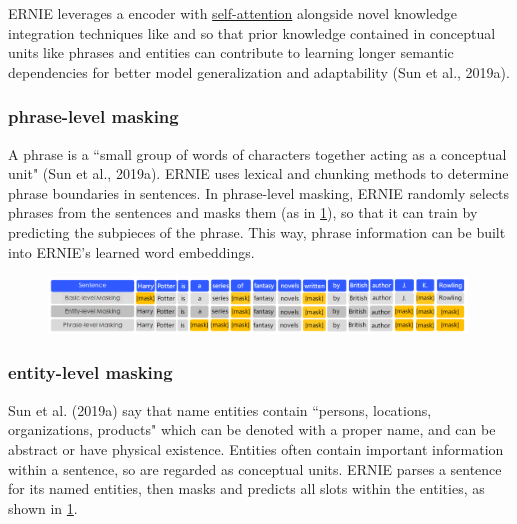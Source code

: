 ERNIE leverages a  encoder with \hyperref[sec:SelfAttention]{self-attention} alongside novel knowledge integration techniques like  and  so that prior knowledge contained in conceptual units like phrases and entities can contribute to learning longer semantic dependencies for better model generalization and adaptability (Sun et al., 2019a). 


\subsubsection{phrase-level masking}\label{sec:phrasemasking}

A phrase is a ``small group of words of characters together acting as a conceptual unit" (Sun et al., 2019a). ERNIE uses lexical and chunking methods to determine phrase boundaries in sentences. In phrase-level masking, ERNIE randomly selects phrases from the sentences and masks them (as in \cref{fig:ernie_maskingTypes}), so that it can train by predicting the subpieces of the phrase. This way, phrase information can be built into ERNIE's learned word embeddings. 



\begin{figure}[h]
\vspace{-5pt}
\centering
\includegraphics[width=0.99\textwidth]{imgs/ernie_maskingtypes.png}
\vspace{-5pt}
\vspace{-5pt}
\label{fig:ernie_maskingTypes}
\end{figure}


\subsubsection{entity-level masking}\label{sec:entitymasking}

Sun et al. (2019a) say that name entities contain ``persons, locations, organizations, products" which can be denoted with a proper name, and can be abstract or have physical existence. Entities often contain important information within a sentence, so are regarded as conceptual units. ERNIE parses a sentence for its named entities, then masks and predicts all slots within the entities, as shown in \cref{fig:ernie_maskingTypes}.


